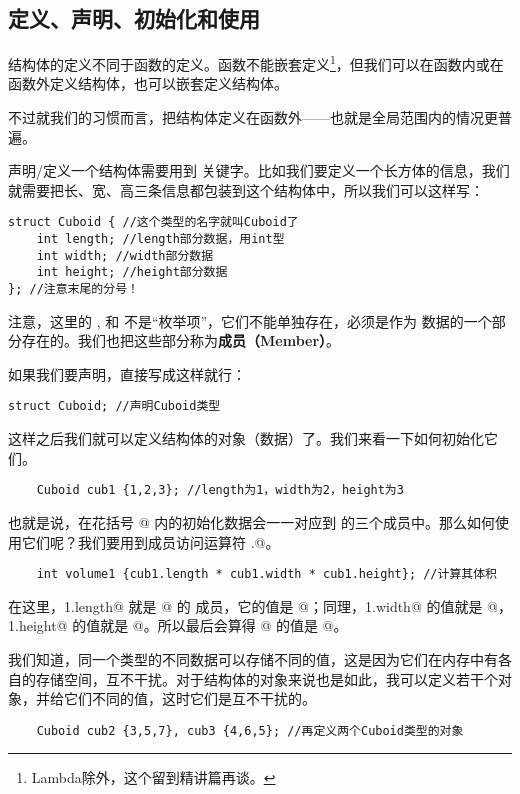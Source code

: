 \subsection*{定义、声明、初始化和使用}
结构体的定义不同于函数的定义。函数不能嵌套定义\footnote{Lambda除外，这个留到精讲篇再谈。}，但我们可以在函数内或在函数外定义结构体，也可以嵌套定义结构体。\par
不过就我们的习惯而言，把结构体定义在函数外——也就是全局范围内的情况更普遍。\par
声明/定义一个结构体需要用到 \lstinline@struct@ 关键字。比如我们要定义一个长方体的信息，我们就需要把长、宽、高三条信息都包装到这个结构体中，所以我们可以这样写：
\begin{lstlisting}
struct Cuboid { //这个类型的名字就叫Cuboid了
    int length; //length部分数据，用int型
    int width; //width部分数据
    int height; //height部分数据
}; //注意末尾的分号！
\end{lstlisting}
注意，这里的 \lstinline@length@, \lstinline@width@ 和 \lstinline@height@ 不是``枚举项''，它们不能单独存在，必须是作为 \lstinline@Cuboid@ 数据的一个部分存在的。我们也把这些部分称为\textbf{成员（Member）}。\par
如果我们要声明，直接写成这样就行：
\begin{lstlisting}
struct Cuboid; //声明Cuboid类型
\end{lstlisting}
这样之后我们就可以定义结构体的对象（数据）了。我们来看一下如何初始化它们。
\begin{lstlisting}
    Cuboid cub1 {1,2,3}; //length为1，width为2，height为3
\end{lstlisting}
也就是说，在花括号 \lstinline@{}@ 内的初始化数据会一一对应到 \lstinline@Cuboid@ 的三个成员中。那么如何使用它们呢？我们要用到成员访问运算符 \lstinline@.@。\par
\begin{lstlisting}
    int volume1 {cub1.length * cub1.width * cub1.height}; //计算其体积
\end{lstlisting}
在这里，\lstinline@cub1.length@ 就是 @ 的 \lstinline@length@ 成员，它的值是 @；同理，\lstinline@cub1.width@ 的值就是 @，\lstinline@cub1.height@ 的值就是 @。所以最后会算得 @ 的值是 @。\par
我们知道，同一个类型的不同数据可以存储不同的值，这是因为它们在内存中有各自的存储空间，互不干扰。对于结构体的对象来说也是如此，我可以定义若干个对象，并给它们不同的值，这时它们是互不干扰的。
\begin{lstlisting}
    Cuboid cub2 {3,5,7}, cub3 {4,6,5}; //再定义两个Cuboid类型的对象
\end{lstlisting}
